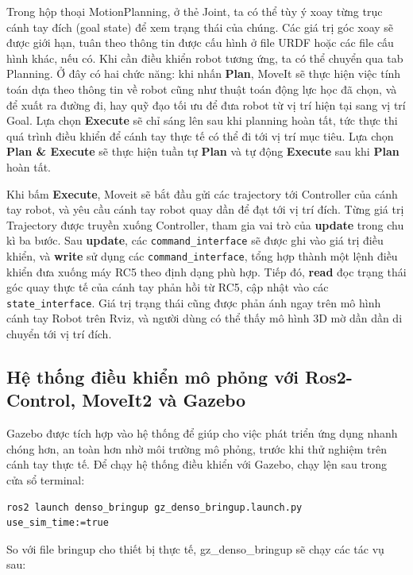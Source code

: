 Trong hộp thoại MotionPlanning, ở thẻ Joint, ta có thể tùy ý xoay từng trục cánh tay đích (goal state) để xem trạng thái của chúng. Các giá trị góc xoay sẽ được giới hạn, tuân theo thông tin được cấu hình ở file URDF hoặc các file cấu hình khác, nếu có. Khi cần điều khiển robot tương ứng, ta có thể chuyển qua tab Planning. Ở đây có hai chức năng: khi nhấn \textbf{Plan}, MoveIt sẽ thực hiện việc tính toán dựa theo thông tin về robot cũng như thuật toán động lực học đã chọn, và để xuất ra đường đi, hay quỹ đạo tối ưu để đưa robot từ vị trí hiện tại sang vị trí Goal. Lựa chọn \textbf{Execute} sẽ chỉ sáng lên sau khi planning hoàn tất, tức thực thi quá trình điều khiển để cánh tay thực tế có thể đi tới vị trí mục tiêu. Lựa chọn \textbf{Plan \& Execute} sẽ thực hiện tuần tự \textbf{Plan} và tự động \textbf{Execute} sau khi \textbf{Plan} hoàn tất.

Khi bấm \textbf{Execute}, Moveit sẽ bắt đầu gửi các trajectory tới Controller của cánh tay robot, và yêu cầu cánh tay robot quay dần để đạt tới vị trí đích. Từng giá trị Trajectory được truyền xuống Controller, tham gia vai trò của \textbf{update} trong chu kì ba bước. Sau \textbf{update}, các \lstinline[style=inlinecode]{command_interface} sẽ được ghi vào giá trị điều khiển, và \textbf{write} sử dụng các \lstinline[style=inlinecode]{command_interface}, tổng hợp thành một lệnh điều khiển đưa xuống máy RC5 theo định dạng phù hợp. Tiếp đó, \textbf{read} đọc trạng thái góc quay thực tế của cánh tay phản hồi từ RC5, cập nhật vào các \lstinline[style=inlinecode]{state_interface}. Giá trị trạng thái cũng được phản ánh ngay trên mô hình cánh tay Robot trên Rviz, và người dùng có thể thấy mô hình 3D mờ dần dần di chuyển tới vị trí đích.

\subsection{Hệ thống điều khiển mô phỏng với Ros2-Control, MoveIt2 và Gazebo}

Gazebo được tích hợp vào hệ thống để giúp cho việc phát triển ứng dụng nhanh chóng hơn, an toàn hơn nhờ môi trường mô phỏng, trước khi thử nghiệm trên cánh tay thực tế. Để chạy hệ thống điều khiển với Gazebo, chạy lện sau trong cửa sổ terminal:

\begin{lstlisting}[style=bashstyle]
ros2 launch denso_bringup gz_denso_bringup.launch.py use_sim_time:=true
\end{lstlisting}

So với file bringup cho thiết bị thực tế, gz\_denso\_bringup sẽ chạy các tác vụ sau:

